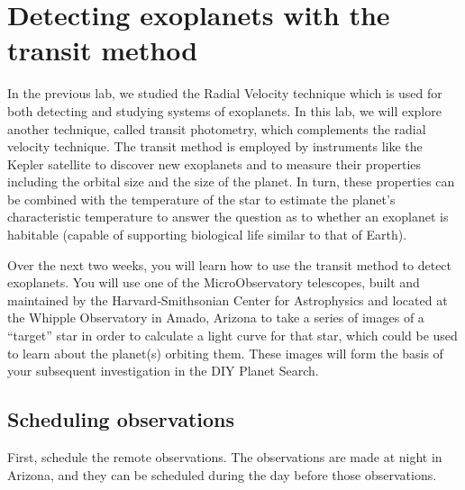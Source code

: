 \chapter{Detecting exoplanets with the transit method}


In the previous lab, we studied the Radial Velocity technique which is
used for both detecting and studying systems of exoplanets. In this lab,
we will explore another technique, called transit photometry, which
complements the radial velocity technique. The transit method is
employed by instruments like the Kepler satellite to discover new
exoplanets and to measure their properties including the orbital size
and the size of the planet. In turn, these properties can be combined
with the temperature of the star to estimate the planet’s characteristic
temperature to answer the question as to whether an exoplanet is
habitable (capable of supporting biological life similar to that of Earth).

Over the next two weeks, you will learn how to use the transit method to detect exoplanets. You will use    one    of    the    MicroObservatory    telescopes,    built    and    maintained    by    the    Harvard‐Smithsonian    Center    for    Astrophysics    and    located    at    the    Whipple    Observatory    in    Amado,    Arizona    to    take    a    series    of    images    of    a    ``target''    star in order to calculate a light curve for that star, which could be used to learn about the planet(s) orbiting them.    These    images    will    form    the    basis    of    your    subsequent    investigation in the DIY Planet Search.

\section{Scheduling observations}

First, schedule the remote observations. The observations are made at night in Arizona, and they can be scheduled during the day before those observations.

